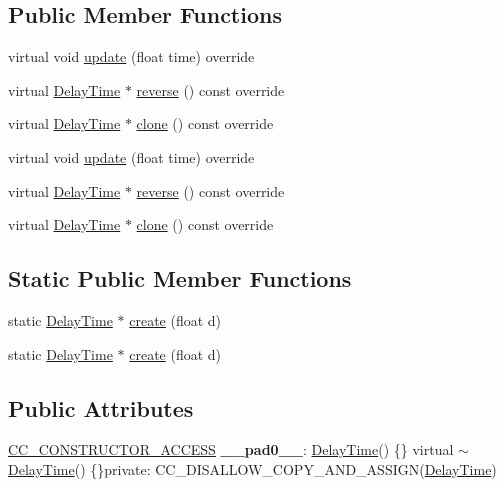 \subsection*{Public Member Functions}
\begin{DoxyCompactItemize}
\item 
virtual void \hyperlink{classDelayTime_a95c80d348c1803a2cb832a3d0e246c5e}{update} (float time) override
\item 
virtual \hyperlink{classDelayTime}{Delay\+Time} $\ast$ \hyperlink{classDelayTime_a83764e1720652642ff03088f0a311c95}{reverse} () const override
\item 
virtual \hyperlink{classDelayTime}{Delay\+Time} $\ast$ \hyperlink{classDelayTime_a8dd10172bc899410a2dc0e9e48a73706}{clone} () const override
\item 
virtual void \hyperlink{classDelayTime_abff66697a3fa8d997d5ae190ec7f6a8e}{update} (float time) override
\item 
virtual \hyperlink{classDelayTime}{Delay\+Time} $\ast$ \hyperlink{classDelayTime_af420fc66d739d4a414057548cb1dff5c}{reverse} () const override
\item 
virtual \hyperlink{classDelayTime}{Delay\+Time} $\ast$ \hyperlink{classDelayTime_a2a5bf1d7c9e02fdb4af4ff1adf8c3734}{clone} () const override
\end{DoxyCompactItemize}
\subsection*{Static Public Member Functions}
\begin{DoxyCompactItemize}
\item 
static \hyperlink{classDelayTime}{Delay\+Time} $\ast$ \hyperlink{classDelayTime_aedcdc4af223fd14e583f3264b2de0a59}{create} (float d)
\item 
static \hyperlink{classDelayTime}{Delay\+Time} $\ast$ \hyperlink{classDelayTime_a77350fbd83e9bff5dd5257fed010dfbb}{create} (float d)
\end{DoxyCompactItemize}
\subsection*{Public Attributes}
\begin{DoxyCompactItemize}
\item 
\mbox{\label{classDelayTime_a19ddde0d73f767635bf5eb5d8f6e20c9}} 
\hyperlink{_2cocos2d_2cocos_2base_2ccConfig_8h_a25ef1314f97c35a2ed3d029b0ead6da0}{C\+C\+\_\+\+C\+O\+N\+S\+T\+R\+U\+C\+T\+O\+R\+\_\+\+A\+C\+C\+E\+SS} {\bfseries \+\_\+\+\_\+pad0\+\_\+\+\_\+}\+: \hyperlink{classDelayTime}{Delay\+Time}() \{\} virtual $\sim$\hyperlink{classDelayTime}{Delay\+Time}() \{\}private\+: C\+C\+\_\+\+D\+I\+S\+A\+L\+L\+O\+W\+\_\+\+C\+O\+P\+Y\+\_\+\+A\+N\+D\+\_\+\+A\+S\+S\+I\+GN(\hyperlink{classDelayTime}{Delay\+Time})
\end{DoxyCompactItemize}

